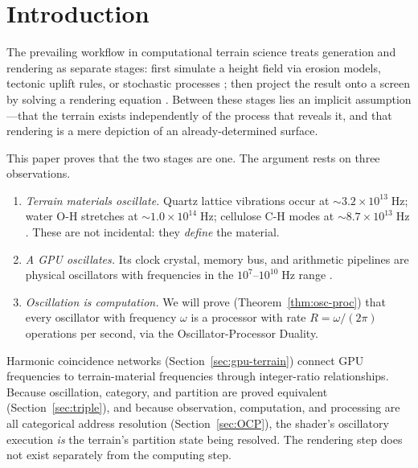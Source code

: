 \documentclass[10pt,twocolumn]{article}
\theoremstyle{definition}
\theoremstyle{remark}
\begin{document}
\section{Introduction}\label{sec:intro}

The prevailing workflow in computational terrain science treats
generation and rendering as separate stages: first simulate a
height field via erosion models, tectonic uplift rules, or
stochastic processes \citep{Perlin1985,Turcotte1997}; then
project the result onto a screen by solving a rendering
equation \citep{Kajiya1986,Pharr2016}.  Between these stages
lies an implicit assumption---that the terrain exists
independently of the process that reveals it, and that
rendering is a mere depiction of an already-determined surface.

This paper proves that the two stages are one.  The argument
rests on three observations.

\begin{enumerate}[leftmargin=*,itemsep=2pt]
\item \emph{Terrain materials oscillate.}  Quartz lattice
  vibrations occur at $\sim 3.2\times 10^{13}\;\mathrm{Hz}$;
  water O-H stretches at $\sim 1.0\times 10^{14}\;\mathrm{Hz}$;
  cellulose C-H modes at $\sim 8.7\times 10^{13}\;\mathrm{Hz}$
  \citep{Herzberg1945,Wilson1955}.  These are not incidental:
  they \emph{define} the material.
\item \emph{A GPU oscillates.}  Its clock crystal, memory bus,
  and arithmetic pipelines are physical oscillators with
  frequencies in the $10^{7}$--$10^{10}\;\mathrm{Hz}$ range
  \citep{Allan1966}.
\item \emph{Oscillation is computation.}  We will prove
  (Theorem~\ref{thm:osc-proc}) that every oscillator with
  frequency $\omega$ is a processor with rate
  $R=\omega/(2\pi)$ operations per second, via the
  Oscillator-Processor Duality.
\end{enumerate}

Harmonic coincidence networks (Section~\ref{sec:gpu-terrain})
connect GPU frequencies to terrain-material frequencies through
integer-ratio relationships.  Because oscillation, category,
and partition are proved equivalent
(Section~\ref{sec:triple}), and because observation,
computation, and processing are all categorical address
resolution (Section~\ref{sec:OCP}), the shader's oscillatory
execution \emph{is} the terrain's partition state being
resolved.  The rendering step does not exist separately from
the computing step.
\end{document}
